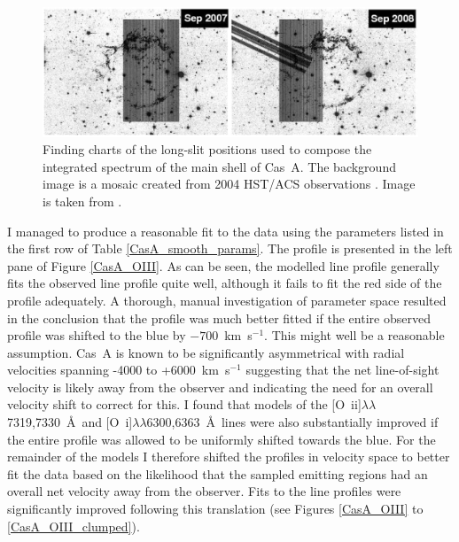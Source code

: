 \begin{figure}
\centering
\includegraphics[clip=true,scale=0.3, trim=0 0 0 0]{chapters/chapter6/figs/CasA/slit_positions.png}
\caption{Finding charts of the long-slit positions used to compose the integrated spectrum of the main shell of Cas~A.  The background image is a mosaic created from 2004 HST/ACS observations \citep{Fesen2006a}.  Image is taken from \citet{Milisavljevic2013}.}
\label{CasA_slit_positions}
\end{figure}

I managed to produce a reasonable fit to the data using the parameters listed in the first row of Table \ref{CasA_smooth_params}.  The profile is presented in the left pane of Figure \ref{CasA_OIII}.  As can be seen,  the modelled line profile generally fits the observed line profile quite well, although it fails to fit the red side of the profile adequately.  A thorough, manual investigation of parameter space resulted in the conclusion that the profile was much better fitted if the entire observed profile was shifted to the blue by $-700$~km~s$^{-1}$.  This might well be a reasonable assumption.  Cas~A is known to be significantly asymmetrical \citep{Rest2011} with radial velocities spanning -4000 to +6000~km~s$^{-1}$ \citep{Milisavljevic2013} suggesting that the net line-of-sight velocity is likely away from the observer and indicating the need for an overall velocity shift to correct for this.  I found that models of the  [O~{\sc ii}]$\lambda\lambda$7319,7330~\AA\ and [O~{\sc i}]$\lambda\lambda$6300,6363~\AA\  lines were also substantially improved if the entire profile was allowed to be uniformly shifted towards the blue.  For the remainder of the models I therefore shifted the profiles in velocity space to better fit the data based on the likelihood that the sampled emitting regions had an overall net velocity away from the observer.  Fits to the line profiles were significantly improved following this translation (see Figures \ref{CasA_OIII} to \ref{CasA_OIII_clumped}).

